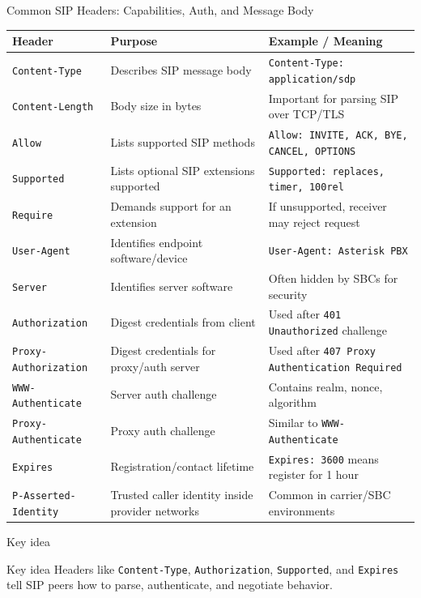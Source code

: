 \documentclass[aspectratio=169]{beamer}
\begin{document}
\begin{frame}{Common SIP Headers: Capabilities, Auth, and Message Body}
\scriptsize
\begin{tabular}{p{2.7cm} p{4.4cm} p{5.0cm}}
\toprule
\textbf{Header} & \textbf{Purpose} & \textbf{Example / Meaning} \\
\midrule
\texttt{Content-Type} & Describes SIP message body & \texttt{Content-Type: application/sdp} \\
\texttt{Content-Length} & Body size in bytes & Important for parsing SIP over TCP/TLS \\
\texttt{Allow} & Lists supported SIP methods & \texttt{Allow: INVITE, ACK, BYE, CANCEL, OPTIONS} \\
\texttt{Supported} & Lists optional SIP extensions supported & \texttt{Supported: replaces, timer, 100rel} \\
\texttt{Require} & Demands support for an extension & If unsupported, receiver may reject request \\
\texttt{User-Agent} & Identifies endpoint software/device & \texttt{User-Agent: Asterisk PBX} \\
\texttt{Server} & Identifies server software & Often hidden by SBCs for security \\
\texttt{Authorization} & Digest credentials from client & Used after \texttt{401 Unauthorized} challenge \\
\texttt{Proxy-Authorization} & Digest credentials for proxy/auth server & Used after \texttt{407 Proxy Authentication Required} \\
\texttt{WWW-Authenticate} & Server auth challenge & Contains realm, nonce, algorithm \\
\texttt{Proxy-Authenticate} & Proxy auth challenge & Similar to \texttt{WWW-Authenticate} \\
\texttt{Expires} & Registration/contact lifetime & \texttt{Expires: 3600} means register for 1 hour \\
\texttt{P-Asserted-Identity} & Trusted caller identity inside provider networks & Common in carrier/SBC environments \\
\bottomrule
\end{tabular}
\end{frame}

\begin{frame}{Key idea}
\begin{block}{Key idea}
Headers like \texttt{Content-Type}, \texttt{Authorization}, \texttt{Supported}, and \texttt{Expires} tell SIP peers how to parse, authenticate, and negotiate behavior.
\end{block}
\end{frame}
\end{document}
